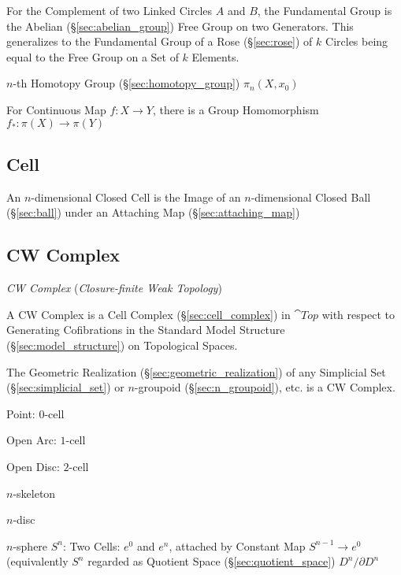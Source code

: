 For the Complement of two Linked Circles $A$ and $B$, the Fundamental
Group is the Abelian (\S\ref{sec:abelian_group}) Free Group on two
Generators. \cite{hatcher02} This generalizes to the Fundamental Group
of a Rose (\S\ref{sec:rose}) of $k$ Circles being equal to the Free
Group on a Set of $k$ Elements.

$n$-th Homotopy Group (\S\ref{sec:homotopy_group}) $\pi_n(X,x_0)$

For Continuous Map $f : X \rightarrow Y$, there is a Group
Homomorphism $f_* : \pi (X) \rightarrow \pi (Y)$



\subsection{Cell}\label{sec:topology_cell}

An $n$-dimensional Closed Cell is the Image of an $n$-dimensional
Closed Ball (\S\ref{sec:ball}) under an Attaching Map
(\S\ref{sec:attaching_map})



\subsection{CW Complex}\label{sec:cw_complex}

\emph{CW Complex} (\emph{Closure-finite Weak Topology})

A CW Complex is a Cell Complex (\S\ref{sec:cell_complex}) in
$\cat{Top}$ with respect to Generating Cofibrations in the Standard
Model Structure (\S\ref{sec:model_structure}) on Topological Spaces.

The Geometric Realization (\S\ref{sec:geometric_realization}) of any
Simplicial Set (\S\ref{sec:simplicial_set}) or $n$-groupoid
(\S\ref{sec:n_groupoid}), etc. is a CW Complex.

Point: $0$-cell

Open Arc: $1$-cell

Open Disc: $2$-cell

$n$-skeleton

$n$-disc

$n$-sphere $S^n$: Two Cells: $e^0$ and $e^n$, attached by Constant Map
$S^{n-1} \rightarrow e^0$ (equivalently $S^n$ regarded as Quotient
Space (\S\ref{sec:quotient_space}) $D^n/ \partial D^n$

